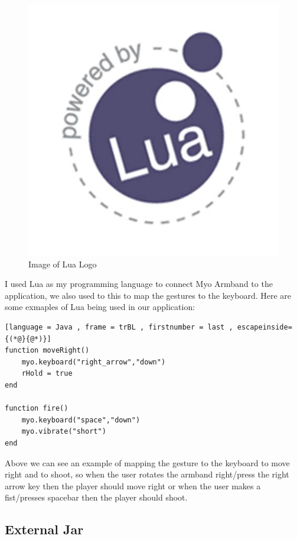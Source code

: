 \documentclass{article}
\begin{document}
\begin{figure}[h]
    \includegraphics[scale=0.5]{img/lualogo.jpeg}
    \centering
    \caption{Image of Lua Logo}
    \label{fig: A Picture of the Lua Logo}
\end{figure}

\hfill \break
I used Lua as my programming language to connect Myo Armband to the application, we also used to this to map the gestures to the keyboard. Here are some exmaples of Lua being used in our application:

\begin{lstlisting}[language = Java , frame = trBL , firstnumber = last , escapeinside={(*@}{@*)}]
function moveRight()
	myo.keyboard("right_arrow","down")
    rHold = true
end

function fire()
	myo.keyboard("space","down")
    myo.vibrate("short")
end
\end{lstlisting}

\hfill \break
Above we can see an example of mapping the gesture to the keyboard to move right and to shoot, so when the user rotates the armband right/press the right arrow key then the player should move right or when the user makes a fist/presses spacebar then the player should shoot.

\subsection{External Jar}
\end{document}
